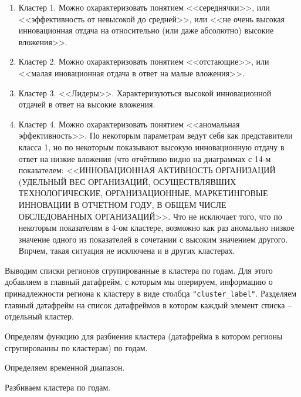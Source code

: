 \documentclass[11pt]{article}
\begin{document}
\begin{enumerate}
\item Кластер 1. Можно охарактеризовать понятием <<середнячки>>, или <<эффективность от невысокой до средней>>, или <<не очень высокая инновационная отдача на относительно (или даже абсолютно) высокие вложения>>.
\item Кластер 2. Можно охарактеризовать понятием <<отстающие>>, или <<малая иновационная отдача в ответ на малые вложения>>.
\item Кластер 3. <<Лидеры>>. Характеризуються высокой инновационной отдачей в ответ на высокие вложения.
\item Кластер 4. Можно охарактеризовать понятием <<аномальная эффективность>>. По некоторым параметрам ведут себя как представители класса 1, но по некоторым показывают высокую инновационную отдачу в ответ на низкие вложения (что отчётливо видно на диаграммах с 14-м показателем: <<ИННОВАЦИОННАЯ АКТИВНОСТЬ ОРГАНИЗАЦИЙ (УДЕЛЬНЫЙ ВЕС  ОРГАНИЗАЦИЙ, ОСУЩЕСТВЛЯВШИХ ТЕХНОЛОГИЧЕСКИЕ, ОРГАНИЗАЦИОННЫЕ, МАРКЕТИНГОВЫЕ ИННОВАЦИИ В ОТЧЕТНОМ ГОДУ, В ОБЩЕМ ЧИСЛЕ ОБСЛЕДОВАННЫХ ОРГАНИЗАЦИЙ>>. 
Что не исключает того, что по некоторым показателям в 4-ом кластере, возможно как раз аномально низкое значение одного из показателей в сочетании с высоким значением другого. Впрчем, такая ситуация не исключена и в других кластерах.
\end{enumerate}

    Выводим списки регионов сгрупированные в кластера по годам. Для этого
добавляем в главный датафрейм, с которым мы оперируем, информацию о
принадлежности региона к кластеру в виде столбца \verb'"cluster_label"'.
Разделяем главный датафрейм на список датафреймов в котором каждый
элемент списка -- отдельный кластер.

    Определям функцию для разбиения кластера (датафрейма в котором регионы
сгрупированны по кластерам) по годам.

    Определяем временной диапазон.

    Разбиваем кластера по годам.
\end{document}
